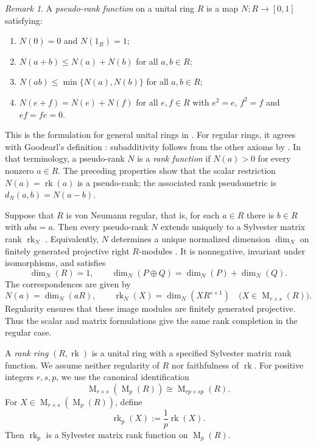 \documentclass[11pt]{amsart}
\DeclareMathOperator{\rk}{rk}
\DeclareMathOperator{\Mat}{M}
\theoremstyle{definition}
\theoremstyle{remark}
\newtheorem{remark}[theorem]{Remark}
\begin{document}
\begin{remark}
\label{rem:pseudo-rank-dimension}
A \emph{pseudo-rank function} on a unital ring $R$ is a map
$N\colon R\to[0,1]$ satisfying:
\begin{enumerate}
    \item \(N(0)=0\) and \(N(1_R)=1\);
    \item \(N(a+b)\leq N(a)+N(b)\) for all \(a,b\in R\);
    \item \(N(ab)\leq\min\{N(a),N(b)\}\) for all \(a,b\in R\);
    \item \(N(e+f)=N(e)+N(f)\) for all \(e,f\in R\) with \(e^2=e\), \(f^2=f\)
  and \(ef=fe=0\).
\end{enumerate}
This is the formulation for general unital rings in
\cite[Definition~2.1]{AraClaramunt2018}.  For regular rings, it agrees
with Goodearl's definition \cite[Chapter~16, p.~226]{Goodearl1991}:
subadditivity follows from the other axioms by
\cite[Proposition~16.1(d)]{Goodearl1991}.
In that terminology, a pseudo-rank $N$ is a \emph{rank function} if
$N(a)>0$ for every nonzero $a\in R$.
The preceding properties show that the scalar restriction
$N(a)=\rk(a)$ is a pseudo-rank; the associated rank pseudometric is
$d_N(a,b)=N(a-b)$.

Suppose that $R$ is von Neumann regular, that is, for each $a\in R$
there is $b\in R$ with $aba=a$.
Then every pseudo-rank $N$ extends uniquely to a Sylvester
matrix rank $\rk_N$ \cite[Proposition~1.3.9]{LopezAlvarez2021}.
Equivalently, $N$ determines a unique normalized
dimension $\dim_N$ on finitely generated projective right $R$-modules
\cite[Proposition~16.8]{Goodearl1991}.
It is nonnegative, invariant under isomorphisms, and satisfies
\[
 \dim_N(R)=1,\qquad
 \dim_N(P\oplus Q)=\dim_N(P)+\dim_N(Q).
\]
The correspondences are given by
\begin{equation}\label{eq:pseudo-rank-projective-dimension}
 N(a)=\dim_N(aR),\qquad
 \rk_N(X)=\dim_N(XR^{s\times1})
 \quad\bigl(X\in\Mat_{r\times s}(R)\bigr).
\end{equation}
Regularity ensures that these image modules are finitely generated
projective.
Thus the scalar and matrix formulations give the same rank completion
in the regular case.
\end{remark}

A \emph{rank ring} $(R,\rk)$ is a unital ring with a specified Sylvester
matrix rank function.
We assume neither regularity of $R$ nor
faithfulness of $\rk$.
For positive integers $r,s,p$, we use the
canonical identification
\[
 \Mat_{r\times s}(\Mat_p(R))
 \cong\Mat_{rp\times sp}(R).
\]
For $X\in\Mat_{r\times s}(\Mat_p(R))$, define
\begin{equation}\label{eq:normalized-matrix-rank}
 \rk_p(X):=\frac1p\rk(X).
\end{equation}
Then $\rk_p$ is a Sylvester matrix rank function on $\Mat_p(R)$.
\end{document}
